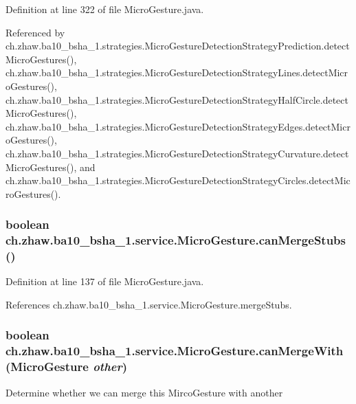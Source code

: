 Definition at line 322 of file MicroGesture.java.

Referenced by ch.zhaw.ba10\_\-bsha\_\-1.strategies.MicroGestureDetectionStrategyPrediction.detectMicroGestures(), ch.zhaw.ba10\_\-bsha\_\-1.strategies.MicroGestureDetectionStrategyLines.detectMicroGestures(), ch.zhaw.ba10\_\-bsha\_\-1.strategies.MicroGestureDetectionStrategyHalfCircle.detectMicroGestures(), ch.zhaw.ba10\_\-bsha\_\-1.strategies.MicroGestureDetectionStrategyEdges.detectMicroGestures(), ch.zhaw.ba10\_\-bsha\_\-1.strategies.MicroGestureDetectionStrategyCurvature.detectMicroGestures(), and ch.zhaw.ba10\_\-bsha\_\-1.strategies.MicroGestureDetectionStrategyCircles.detectMicroGestures().\hypertarget{classch_1_1zhaw_1_1ba10__bsha__1_1_1service_1_1MicroGesture_af67a2c2d66724e55b7b3af29e220b91c}{
\subsubsection[{canMergeStubs}]{\setlength{\rightskip}{0pt plus 5cm}boolean ch.zhaw.ba10\_\-bsha\_\-1.service.MicroGesture.canMergeStubs ()}}
\label{classch_1_1zhaw_1_1ba10__bsha__1_1_1service_1_1MicroGesture_af67a2c2d66724e55b7b3af29e220b91c}


Definition at line 137 of file MicroGesture.java.

References ch.zhaw.ba10\_\-bsha\_\-1.service.MicroGesture.mergeStubs.\hypertarget{classch_1_1zhaw_1_1ba10__bsha__1_1_1service_1_1MicroGesture_aa86fa9810f2f6155bf027c5c358861bd}{
\subsubsection[{canMergeWith}]{\setlength{\rightskip}{0pt plus 5cm}boolean ch.zhaw.ba10\_\-bsha\_\-1.service.MicroGesture.canMergeWith ({\bf MicroGesture} {\em other})}}
\label{classch_1_1zhaw_1_1ba10__bsha__1_1_1service_1_1MicroGesture_aa86fa9810f2f6155bf027c5c358861bd}
Determine whether we can merge this MircoGesture with another


